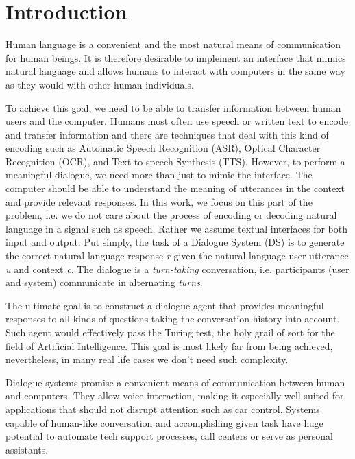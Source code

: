 \chapter{Introduction}%
\label{chap:intro}
Human language is a convenient and the most natural means of communication for human beings.
It is therefore desirable to implement an interface that mimics natural language and allows humans to interact with computers in the same way as they would with other human individuals.

To achieve this goal, we need to be able to transfer information between human users and the computer.
Humans most often use speech or written text to encode and transfer information and there are techniques that deal with this kind of encoding such as Automatic Speech Recognition (ASR), Optical Character Recognition (OCR), and Text-to-speech Synthesis (TTS).
However, to perform a meaningful dialogue, we need more than just to mimic the interface.
The computer should be able to understand the meaning of utterances in the context and provide relevant responses.
In this work, we focus on this part of the problem, i.e. we do not care about the process of encoding or decoding natural language in a signal such as speech.
Rather we assume textual interfaces for both input and output.
Put simply, the task of a Dialogue System (DS) is to generate the correct natural language response \textit{r} given the natural language user utterance \textit{u} and context \textit{c}.
The dialogue is a \textit{turn-taking} conversation, i.e. participants (user and system) communicate in alternating \textit{turns}.

The ultimate goal is to construct a dialogue agent that provides meaningful responses to all kinds of questions taking the conversation history into account.
Such agent would effectively pass the Turing test, the holy grail of sort for the field of Artificial Intelligence.
This goal is most likely far from being achieved, nevertheless, in many real life cases we don't need such complexity.

Dialogue systems promise a convenient means of communication between human and computers.
They allow voice interaction, making it especially well suited for applications that should not disrupt attention such as car control.
Systems capable of human-like conversation and accomplishing given task have huge potential to automate tech support processes, call centers or serve as personal assistants.


